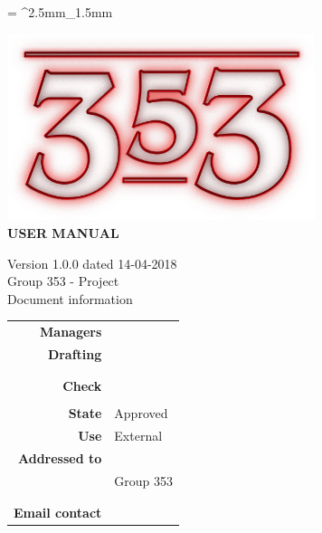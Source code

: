 \documentclass[openany, a4paper, 12pt]{report}
\begin{document}
	
	\tabulinesep = ^2.5mm_1.5mm
	
	\begin{titlepage}
		\centering
		\vfill
		{
			\bfseries
			\vskip2cm
			\includegraphics[width=9cm]{../../common/images/logo.png} \\
			\vfill
			\Huge{USER MANUAL}\\
			\vfill

			\Large Version 1.0.0 dated 14-04-2018\\ 
			\large Group 353 - Project \progetto \\
			\vfill
			\normalsize Document information\\
			\begin{table}[htbp]
				\centering
				\renewcommand\arraystretch{1.2}
				\begin{tabular}{r|l}
					\hline

					\textbf{Managers}		& \Valentina \\
					
					\textbf{Drafting} 		& \Davide \\
											& \Gianluca \\
											& \Riccardo \\
											
					\textbf{Check} 			& \Mirco \\	
											& \Parwinder \\
											
					\textbf{State} 			& Approved\\
					\textbf{Use}			& External\\
					\textbf{Addressed to}   & \Proponente\\
										& Group 353\\
										& \Vardanega\\
										& \Cardin\\
					
					\textbf{Email contact}	& \mailgroup
				\end{tabular}
			\end{table}
			\vfill
		}    
	\end{titlepage}
	
	\renewcommand{\contentsname}{Index}
	\tableofcontents
	\renewcommand{\listfigurename}{List of Figures}
	\listoffigures
	\newpage
	
	
	
	
	
	
	
	
\end{document}
